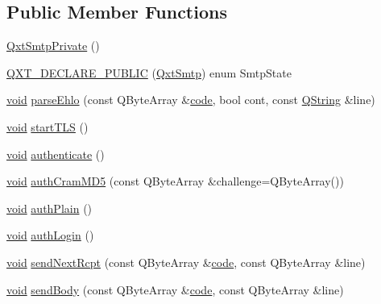 \subsection*{Public Member Functions}
\begin{DoxyCompactItemize}
\item 
\hyperlink{class_qxt_smtp_private_a94ab9182e9be9044c6a7ed638a5994d5}{Qxt\-Smtp\-Private} ()
\item 
\hyperlink{class_qxt_smtp_private_ad7217de6c5925b4fb9aa55869cfcf5b7}{Q\-X\-T\-\_\-\-D\-E\-C\-L\-A\-R\-E\-\_\-\-P\-U\-B\-L\-I\-C} (\hyperlink{class_qxt_smtp}{Qxt\-Smtp}) enum Smtp\-State
\item 
\hyperlink{group___u_a_v_objects_plugin_ga444cf2ff3f0ecbe028adce838d373f5c}{void} \hyperlink{class_qxt_smtp_private_af530922e9e36bc24407cd1d37399e5d1}{parse\-Ehlo} (const Q\-Byte\-Array \&\hyperlink{structcode}{code}, bool cont, const \hyperlink{group___u_a_v_objects_plugin_gab9d252f49c333c94a72f97ce3105a32d}{Q\-String} \&line)
\item 
\hyperlink{group___u_a_v_objects_plugin_ga444cf2ff3f0ecbe028adce838d373f5c}{void} \hyperlink{class_qxt_smtp_private_a2dca90caca14f6a51807136772be3982}{start\-T\-L\-S} ()
\item 
\hyperlink{group___u_a_v_objects_plugin_ga444cf2ff3f0ecbe028adce838d373f5c}{void} \hyperlink{class_qxt_smtp_private_a41c29784a5b4388528789463de142016}{authenticate} ()
\item 
\hyperlink{group___u_a_v_objects_plugin_ga444cf2ff3f0ecbe028adce838d373f5c}{void} \hyperlink{class_qxt_smtp_private_a5901259cbcc5983b7ce07b7ce52c0dd5}{auth\-Cram\-M\-D5} (const Q\-Byte\-Array \&challenge=Q\-Byte\-Array())
\item 
\hyperlink{group___u_a_v_objects_plugin_ga444cf2ff3f0ecbe028adce838d373f5c}{void} \hyperlink{class_qxt_smtp_private_aa2c2784cacd1fa5827316ce6ddf94cea}{auth\-Plain} ()
\item 
\hyperlink{group___u_a_v_objects_plugin_ga444cf2ff3f0ecbe028adce838d373f5c}{void} \hyperlink{class_qxt_smtp_private_a8f3ec43b8abce700725dfec8b40b0082}{auth\-Login} ()
\item 
\hyperlink{group___u_a_v_objects_plugin_ga444cf2ff3f0ecbe028adce838d373f5c}{void} \hyperlink{class_qxt_smtp_private_abd19ba59ad1c7fef3ee1fa72a0518cc2}{send\-Next\-Rcpt} (const Q\-Byte\-Array \&\hyperlink{structcode}{code}, const Q\-Byte\-Array \&line)
\item 
\hyperlink{group___u_a_v_objects_plugin_ga444cf2ff3f0ecbe028adce838d373f5c}{void} \hyperlink{class_qxt_smtp_private_a03fa60815b1b4cb6825e09017c60d719}{send\-Body} (const Q\-Byte\-Array \&\hyperlink{structcode}{code}, const Q\-Byte\-Array \&line)
\end{DoxyCompactItemize}
